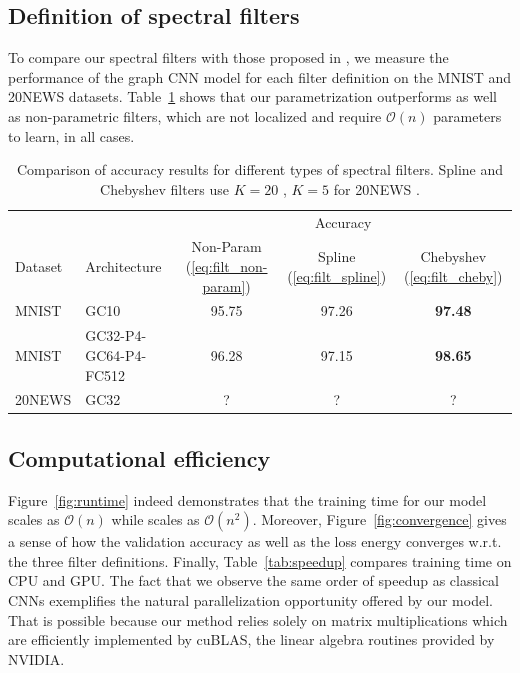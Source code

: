 \documentclass{article}
\newcommand{\bO}{\mathcal{O}}
\newcommand{\figref}[1]{Figure~\ref{fig:#1}}
\newcommand{\tabref}[1]{Table~\ref{tab:#1}}
\newcommand{\eqnref}[1]{(\ref{eq:#1})}
\newcommand{\bruna}{art:BrunaZarembaSzlamLeCun13DLgraphs,
art:HenaffBrunaLeCun15DLgraphs}
\newcommand{\todo}[1]{{\color{red} #1 }}
\begin{document}
\subsection{Definition of spectral filters}

To compare our spectral filters with those proposed in \cite{\bruna}, we measure
the performance of the graph CNN model for each filter definition on the MNIST
and 20NEWS datasets. \tabref{filters} shows that our parametrization outperforms
\cite{\bruna} as well as non-parametric filters, which are not localized and
require $\bO(n)$ parameters to learn, in all cases.

\begin{table}[h!] \centering
\begin{tabular}{llccc} \toprule
& & \multicolumn{3}{c}{Accuracy} \\
\cmidrule{3-5}
Dataset & Architecture & Non-Param \eqnref{filt_non-param} &
Spline \eqnref{filt_spline} \cite{\bruna} &
Chebyshev \eqnref{filt_cheby} \\
\midrule
MNIST & GC10 & 95.75 & 97.26 & \textbf{97.48} \\
MNIST & GC32-P4-GC64-P4-FC512 & 96.28 & 97.15 & \textbf{98.65} \\
20NEWS & GC32 & \todo{?} & \todo{?} & \todo{?} \\
\bottomrule \end{tabular}
\caption{Comparison of accuracy results for different types of spectral filters.
Spline and Chebyshev filters use \todo{$K=20$}, \todo{$K=5$ for 20NEWS}.} 
\label{tab:filters}
\end{table}

\subsection{Computational efficiency}

\figref{runtime} indeed demonstrates that the training time for our model scales
as $\bO(n)$ while \cite{\bruna} scales as $\bO(n^2)$. Moreover,
\figref{convergence} gives a sense of how the validation accuracy as well as the
loss energy converges w.r.t. the three filter definitions. Finally,
\tabref{speedup} compares training time on CPU and GPU. The fact that we observe
the same order of speedup as classical CNNs exemplifies the natural
parallelization opportunity offered by our model. That is possible because our
method relies solely on matrix multiplications which are efficiently implemented
by cuBLAS, the linear algebra routines provided by NVIDIA.
\end{document}
